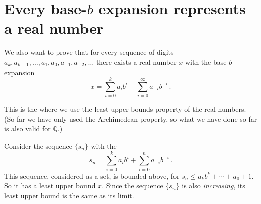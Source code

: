 \documentclass[12pt]{article}
\newcommand{\rat}{\mathbb{Q}}
\begin{document}
\section{Every base-$b$ expansion represents a real number}

We also want to prove that for every sequence of digits $a_k, a_{k-1}, \dotsc, a_1, a_0, a_{-1}, a_{-2}, \dotsc$
there exists a real number $x$
with the base-$b$ expansion
\[
x = \sum_{i=0}^k a_i b^i + \sum_{i=0}^\infty a_{-i} b^{-i}\,.
\]

This is the  where we use the least upper bounds property of the 
real numbers.  (So far we have only used the Archimedean property,
so what we have done so far is also valid for $\rat$.)

Consider the sequence $\{ s_n \}$ with the 
\[
s_n = \sum_{i=0}^k a_i b^i + \sum_{i=0}^n a_{-i} b^{-i}\,.
\]
This sequence, considered as a set,
is bounded above, for $s_n \leq a_k b^k + \dotsb + a_0 + 1$.
So it has a least upper bound $x$. 
Since the sequence $\{ s_n \}$ is also \emph{increasing},
its least upper bound is the same as its
limit.
\end{document}
